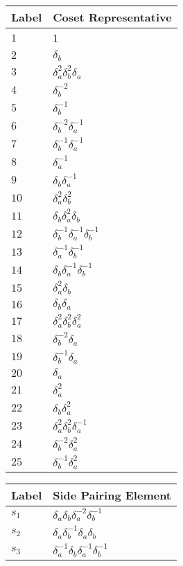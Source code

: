 \documentclass{article}
\begin{document}

\begin{center}
\begin{tabular}{ll}
\toprule
Label & Coset Representative\\
\midrule
$1$ & 1 \\
$2$ & $\delta_b^{}$ \\
$3$ & $\delta_a^{2}\delta_b^{2}\delta_a^{}$ \\
$4$ & $\delta_b^{-2}$ \\
$5$ & $\delta_b^{-1}$ \\
$6$ & $\delta_b^{-2}\delta_a^{-1}$ \\
$7$ & $\delta_b^{-1}\delta_a^{-1}$ \\
$8$ & $\delta_a^{-1}$ \\
$9$ & $\delta_b^{}\delta_a^{-1}$ \\
$10$ & $\delta_a^{2}\delta_b^{2}$ \\
$11$ & $\delta_b^{}\delta_a^{2}\delta_b^{}$ \\
$12$ & $\delta_b^{-1}\delta_a^{-1}\delta_b^{-1}$ \\
$13$ & $\delta_a^{-1}\delta_b^{-1}$ \\
$14$ & $\delta_b^{}\delta_a^{-1}\delta_b^{-1}$ \\
$15$ & $\delta_a^{2}\delta_b^{}$ \\
$16$ & $\delta_b^{}\delta_a^{}$ \\
$17$ & $\delta_a^{2}\delta_b^{2}\delta_a^{2}$ \\
$18$ & $\delta_b^{-2}\delta_a^{}$ \\
$19$ & $\delta_b^{-1}\delta_a^{}$ \\
$20$ & $\delta_a^{}$ \\
$21$ & $\delta_a^{2}$ \\
$22$ & $\delta_b^{}\delta_a^{2}$ \\
$23$ & $\delta_a^{2}\delta_b^{2}\delta_a^{-1}$ \\
$24$ & $\delta_b^{-2}\delta_a^{2}$ \\
$25$ & $\delta_b^{-1}\delta_a^{2}$ \\
\bottomrule
\end{tabular}
\hfill
\begin{tabular}{ll}
\toprule
Label & Side Pairing Element\\
\midrule
$s_{1}$ & $\delta_a^{}\delta_b^{}\delta_a^{-2}\delta_b^{-1}$ \\
$s_{2}$ & $\delta_a^{}\delta_b^{-1}\delta_a^{}\delta_b^{}$ \\
$s_{3}$ & $\delta_a^{-1}\delta_b^{}\delta_a^{-1}\delta_b^{-1}$ \\

\end{tabular}
\end{center}
\end{document}
